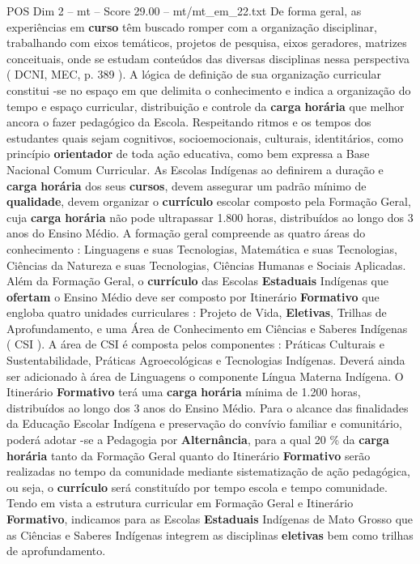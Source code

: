 \begin{textsample}{POS Dim 2 – mt – Score 29.00 – mt/mt\_em\_22.txt}
De forma geral, as experiências em \textbf{curso} têm buscado romper com a organização disciplinar, trabalhando com eixos temáticos, projetos de pesquisa, eixos geradores, matrizes conceituais, onde se estudam conteúdos das diversas disciplinas nessa perspectiva ( DCNI, MEC, p. 389 ).
A lógica de definição de sua organização curricular constitui -se no espaço em que delimita o conhecimento e indica a organização do tempo e espaço curricular, distribuição e controle da \textbf{carga} \textbf{horária} que melhor ancora o fazer pedagógico da Escola.
Respeitando ritmos e os tempos dos estudantes quais sejam cognitivos, socioemocionais, culturais, identitários, como princípio \textbf{orientador} de toda ação educativa, como bem expressa a Base Nacional Comum Curricular.
As Escolas Indígenas ao definirem a duração e \textbf{carga} \textbf{horária} dos seus \textbf{cursos}, devem assegurar um padrão mínimo de \textbf{qualidade}, devem organizar o \textbf{currículo} escolar composto pela Formação Geral, cuja \textbf{carga} \textbf{horária} não pode ultrapassar 1.800 horas, distribuídos ao longo dos 3 anos do Ensino Médio.
A formação geral compreende as quatro áreas do conhecimento : Linguagens e suas Tecnologias, Matemática e suas Tecnologias, Ciências da Natureza e suas Tecnologias, Ciências Humanas e Sociais Aplicadas.
Além da Formação Geral, o \textbf{currículo} das Escolas \textbf{Estaduais} Indígenas que \textbf{ofertam} o Ensino Médio deve ser composto por Itinerário \textbf{Formativo} que engloba quatro unidades curriculares : Projeto de Vida, \textbf{Eletivas}, Trilhas de Aprofundamento, e uma Área de Conhecimento em Ciências e Saberes Indígenas ( CSI ).
A área de CSI é composta pelos componentes : Práticas Culturais e Sustentabilidade, Práticas Agroecológicas e Tecnologias Indígenas.
Deverá ainda ser adicionado à área de Linguagens o componente Língua Materna Indígena.
O Itinerário \textbf{Formativo} terá uma \textbf{carga} \textbf{horária} mínima de 1.200 horas, distribuídos ao longo dos 3 anos do Ensino Médio.
Para o alcance das finalidades da Educação Escolar Indígena e preservação do convívio familiar e comunitário, poderá adotar -se a Pedagogia por \textbf{Alternância}, para a qual 20 \% da \textbf{carga} \textbf{horária} tanto da Formação Geral quanto do Itinerário \textbf{Formativo} serão realizadas no tempo da comunidade mediante sistematização de ação pedagógica, ou seja, o \textbf{currículo} será constituído por tempo escola e tempo comunidade.
Tendo em vista a estrutura curricular em Formação Geral e Itinerário \textbf{Formativo}, indicamos para as Escolas \textbf{Estaduais} Indígenas de Mato Grosso que as Ciências e Saberes Indígenas integrem as disciplinas \textbf{eletivas} bem como trilhas de aprofundamento.

\end{textsample}
